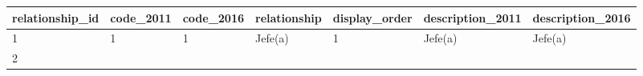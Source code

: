 \documentclass[
]{book}
\begin{document}
\begin{longtable}[]{@{}lllllll@{}}
\toprule
\begin{minipage}[b]{0.10\columnwidth}\raggedright
relationship\_id\strut
\end{minipage} & \begin{minipage}[b]{0.07\columnwidth}\raggedright
code\_2011\strut
\end{minipage} & \begin{minipage}[b]{0.07\columnwidth}\raggedright
code\_2016\strut
\end{minipage} & \begin{minipage}[b]{0.16\columnwidth}\raggedright
relationship\strut
\end{minipage} & \begin{minipage}[b]{0.09\columnwidth}\raggedright
display\_order\strut
\end{minipage} & \begin{minipage}[b]{0.16\columnwidth}\raggedright
description\_2011\strut
\end{minipage} & \begin{minipage}[b]{0.16\columnwidth}\raggedright
description\_2016\strut
\end{minipage}\tabularnewline
\midrule
\endhead
\begin{minipage}[t]{0.10\columnwidth}\raggedright
1\strut
\end{minipage} & \begin{minipage}[t]{0.07\columnwidth}\raggedright
1\strut
\end{minipage} & \begin{minipage}[t]{0.07\columnwidth}\raggedright
1\strut
\end{minipage} & \begin{minipage}[t]{0.16\columnwidth}\raggedright
Jefe(a)\strut
\end{minipage} & \begin{minipage}[t]{0.09\columnwidth}\raggedright
1\strut
\end{minipage} & \begin{minipage}[t]{0.16\columnwidth}\raggedright
Jefe(a)\strut
\end{minipage} & \begin{minipage}[t]{0.16\columnwidth}\raggedright
Jefe(a)\strut
\end{minipage}\tabularnewline
\begin{minipage}[t]{0.10\columnwidth}\raggedright
2\strut
\end{minipage} & \begin{minipage}[t]{0.07\columnwidth}\raggedright

\end{minipage}
\end{longtable}
\end{document}

